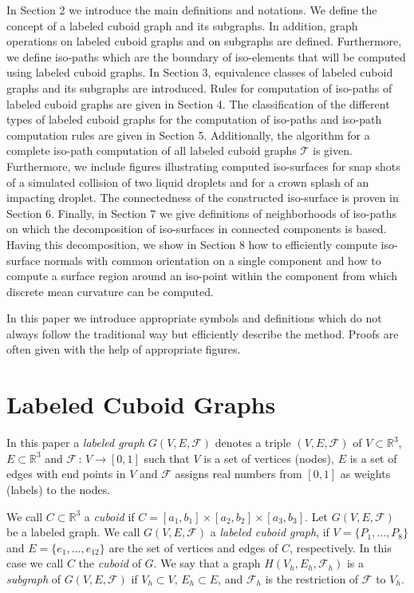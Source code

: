 \documentclass[a4paper,11pt]{article}
\begin{document}
\noindent In Section 2 we introduce the main definitions and notations. We define
the concept of a labeled cuboid graph and its subgraphs. In addition, graph operations on
labeled cuboid graphs and on subgraphs are defined. Furthermore, we define iso-paths which
are the boundary of iso-elements that will be computed using labeled cuboid graphs. In Section 3,
equivalence classes of labeled cuboid graphs and its subgraphs are introduced. Rules for computation
of iso-paths of labeled cuboid graphs are given in Section 4. The classification of the different
types of labeled cuboid graphs for the computation of iso-paths and iso-path computation rules are
given in Section 5. Additionally, the algorithm for a complete iso-path computation of all labeled
cuboid graphs $\mathcal{T}$ is given. Furthermore, we include figures illustrating computed iso-surfaces
for snap shots of a simulated collision of two liquid droplets and
for a crown splash of an impacting droplet. The connectedness of the constructed iso-surface is proven
in Section 6. Finally, in Section 7 we give definitions of neighborhoods of iso-paths on which
the decomposition of iso-surfaces in connected components is based. Having this decomposition, we
show in Section 8 how to efficiently compute iso-surface normals with common orientation on a single component
and how to compute a surface region around an iso-point within the component from which discrete mean curvature
can be computed.

In this paper we introduce appropriate symbols and definitions which do not always follow the traditional way
but efficiently describe the method. Proofs are often given with the help of appropriate figures.
\newpage
\section{Labeled Cuboid Graphs}
In this paper a {\it labeled graph} $G(V,E,\mathcal{F})$ denotes a triple $(V,E,\mathcal{F})$ of
$V\subset\mathbb{R}^3$, $E\subset\mathbb{R}^3$ and $\mathcal{F}\,:\,V\longrightarrow [0,1]$ such
that $V$ is a set of vertices (nodes), $E$ is a set of edges with end points in $V$ and
$\mathcal{F}$ assigns real numbers from $[0,1]$ as weights (labels) to the nodes.

We call $C\subset\mathbb{R}^3$ a {\it cuboid} if $C=[a_1,b_1]\times[a_2,b_2]\times[a_3,b_3]$.
Let $G(V,E,\mathcal{F})$ be a labeled graph. We call $G(V,E,\mathcal{F})$ a {\it labeled cuboid graph},
if $V=\{P_1,\ldots,P_8\}$ and $E=\{e_1,\ldots,e_{12}\}$ are the set of vertices and edges of $C$,
respectively. In this case we call $C$ the {\it cuboid} of $G$. We say that a graph
$H(V_h,E_h,\mathcal{F}_h)$ is a {\it subgraph} of $G(V,E,\mathcal{F})$ if $V_h\subset V$,
$E_h\subset E$, and $\mathcal{F}_h$ is the restriction of $\mathcal{F}$ to $V_h$.
\end{document}
